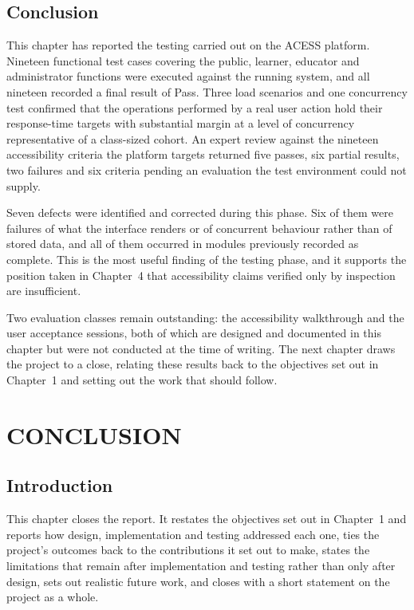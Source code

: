\documentclass[12pt, oneside]{article} %
\begin{document}
\subsection{Conclusion}

This chapter has reported the testing carried out on the ACESS platform. Nineteen functional test cases covering the public, learner, educator and administrator functions were executed against the running system, and all nineteen recorded a final result of Pass. Three load scenarios and one concurrency test confirmed that the operations performed by a real user action hold their response-time targets with substantial margin at a level of concurrency representative of a class-sized cohort. An expert review against the nineteen accessibility criteria the platform targets returned five passes, six partial results, two failures and six criteria pending an evaluation the test environment could not supply.

Seven defects were identified and corrected during this phase. Six of them were failures of what the interface renders or of concurrent behaviour rather than of stored data, and all of them occurred in modules previously recorded as complete. This is the most useful finding of the testing phase, and it supports the position taken in Chapter~4 that accessibility claims verified only by inspection are insufficient.

Two evaluation classes remain outstanding: the accessibility walkthrough and the user acceptance sessions, both of which are designed and documented in this chapter but were not conducted at the time of writing. The next chapter draws the project to a close, relating these results back to the objectives set out in Chapter~1 and setting out the work that should follow.

\newpage
\section{CONCLUSION}
\label{sec:conclusion}

\subsection{Introduction}

This chapter closes the report. It restates the objectives set out in Chapter~1 and reports how design, implementation and testing addressed each one, ties the project's outcomes back to the contributions it set out to make, states the limitations that remain after implementation and testing rather than only after design, sets out realistic future work, and closes with a short statement on the project as a whole.
\end{document}
